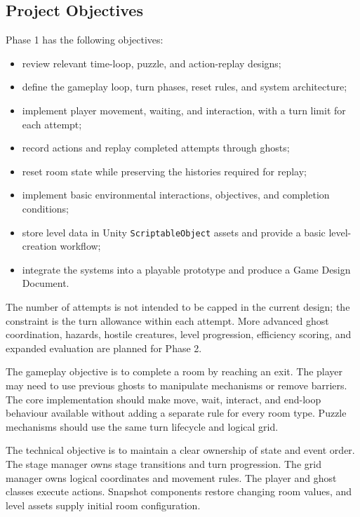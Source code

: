 \subsection{Project Objectives}

Phase 1 has the following objectives:

\begin{itemize}
    \item review relevant time-loop, puzzle, and action-replay designs;
    \item define the gameplay loop, turn phases, reset rules, and system architecture;
    \item implement player movement, waiting, and interaction, with a turn limit for each attempt;
    \item record actions and replay completed attempts through ghosts;
    \item reset room state while preserving the histories required for replay;
    \item implement basic environmental interactions, objectives, and completion conditions;
    \item store level data in Unity \texttt{ScriptableObject} assets and provide a basic level-creation workflow;
    \item integrate the systems into a playable prototype and produce a Game Design Document.
\end{itemize}

The number of attempts is not intended to be capped in the current design; the constraint is the turn allowance within each attempt. More advanced ghost coordination, hazards, hostile creatures, level progression, efficiency scoring, and expanded evaluation are planned for Phase 2.


The gameplay objective is to complete a room by reaching an exit. The player may need to use previous ghosts to manipulate mechanisms or remove barriers. The core implementation should make move, wait, interact, and end-loop behaviour available without adding a separate rule for every room type. Puzzle mechanisms should use the same turn lifecycle and logical grid.


The technical objective is to maintain a clear ownership of state and event order. The stage manager owns stage transitions and turn progression. The grid manager owns logical coordinates and movement rules. The player and ghost classes execute actions. Snapshot components restore changing room values, and level assets supply initial room configuration.

